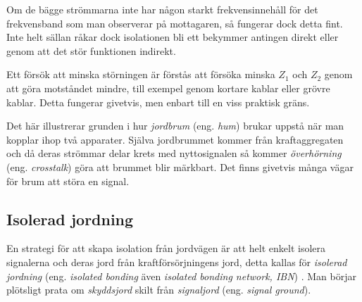 Om de bägge strömmarna inte har någon starkt frekvensinnehåll för det
frekvensband som man observerar på mottagaren, så fungerar dock detta fint.
Inte helt sällan råkar dock isolationen bli ett bekymmer antingen direkt eller
genom att det stör funktionen indirekt.

Ett försök att minska störningen är förstås att försöka minska \(Z_1\) och
\(Z_2\) genom att göra motståndet mindre, till exempel genom kortare kablar eller
grövre kablar.
Detta fungerar givetvis, men enbart till en viss praktisk gräns.

Det här illustrerar grunden i hur \emph{jordbrum} (eng. \emph{hum}) brukar
uppstå när man kopplar ihop två apparater.
Själva jordbrummet kommer från kraftaggregaten och då deras strömmar delar
krets med nyttosignalen så kommer \emph{överhörning} (eng. \emph{crosstalk})
göra att brummet blir märkbart.
Det finns givetvis många vägar för brum att störa en signal.

\subsection{Isolerad jordning}

En strategi för att skapa isolation från jordvägen är att helt enkelt
isolera signalerna och deras jord från kraftförsörjningens jord, detta kallas
för \emph{isolerad jordning} (eng. \emph{isolated bonding} även \emph{isolated
 bonding network, IBN}) \cite[kap 3.2.4]{K27-1991}.
Man börjar plötsligt prata om \emph{skyddsjord} skilt från \emph{signaljord}
(eng. \emph{signal ground}).


